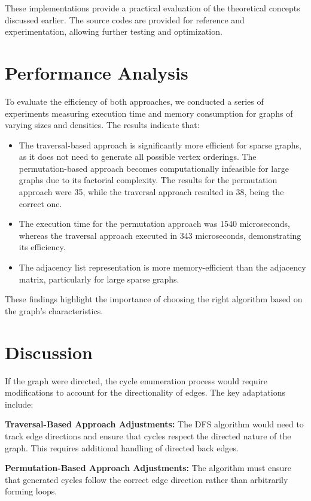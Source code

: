\documentclass{sbc2023}%
\begin{document}
These implementations provide a practical evaluation of the theoretical concepts discussed earlier. The source codes are provided for reference and experimentation, allowing further testing and optimization.

\section{Performance Analysis}

To evaluate the efficiency of both approaches, we conducted a series of experiments measuring execution time and memory consumption for graphs of varying sizes and densities. The results indicate that:
\begin{itemize}
    \item The traversal-based approach is significantly more efficient for sparse graphs, as it does not need to generate all possible vertex orderings.
    The permutation-based approach becomes computationally infeasible for large graphs due to its factorial complexity. The results for the permutation approach were 35, while the traversal approach resulted in 38, being the correct one.
    \item The execution time for the permutation approach was 1540 microseconds, whereas the traversal approach executed in 343 microseconds, demonstrating its efficiency.
    \item The adjacency list representation is more memory-efficient than the adjacency matrix, particularly for large sparse graphs.
\end{itemize}

These findings highlight the importance of choosing the right algorithm based on the graph’s characteristics.
\section{Discussion}

If the graph were directed, the cycle enumeration process would require modifications to account for the directionality of edges. The key adaptations include:

\textbf{Traversal-Based Approach Adjustments:} The DFS algorithm would need to track edge directions and ensure that cycles respect the directed nature of the graph. This requires additional handling of directed back edges.

\textbf{Permutation-Based Approach Adjustments:} The algorithm must ensure that generated cycles follow the correct edge direction rather than arbitrarily forming loops.
\end{document}
